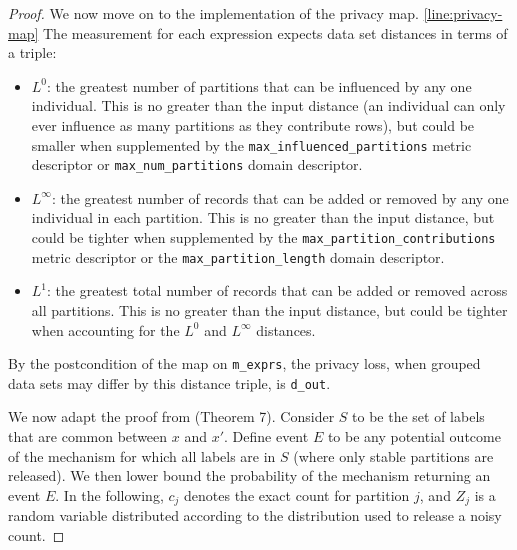 \documentclass{article}
\begin{document}
\begin{proof}
We now move on to the implementation of the privacy map. \ref{line:privacy-map}
The measurement for each expression expects data set distances in terms of a triple:
\begin{itemize}
    \item $L^0$: the greatest number of partitions that can be influenced by any one individual. 
    This is no greater than the input distance (an individual can only ever influence as many partitions as they contribute rows), 
    but could be smaller when supplemented by 
    the \texttt{max\_influenced\_partitions} metric descriptor or \texttt{max\_num\_partitions} domain descriptor.
    \item $L^\infty$: the greatest number of records that can be added or removed by any one individual in each partition. 
    This is no greater than the input distance, 
    but could be tighter when supplemented by 
    the \texttt{max\_partition\_contributions} metric descriptor or the \texttt{max\_partition\_length} domain descriptor.
    \item $L^1$: the greatest total number of records that can be added or removed across all partitions.
    This is no greater than the input distance,
    but could be tighter when accounting for the $L^0$ and $L^\infty$ distances.
\end{itemize}

By the postcondition of the map on \texttt{m\_exprs}, the privacy loss, 
when grouped data sets may differ by this distance triple,
is \texttt{d\_out}.



We now adapt the proof from \cite{rogers2023unifyingprivacyanalysisframework} (Theorem 7).
Consider $S$ to be the set of labels that are common between $x$ and $x'$.
Define event $E$ to be any potential outcome of the mechanism for which all labels are in $S$
(where only stable partitions are released).
We then lower bound the probability of the mechanism returning an event $E$.
In the following, $c_j$ denotes the exact count for partition $j$,
and $Z_j$ is a random variable distributed according to the distribution used to release a noisy count.


\end{proof}
\end{document}
